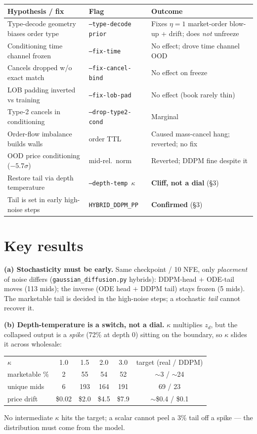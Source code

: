 \documentclass[11pt]{article}
\newcommand{\code}[1]{\texttt{\small #1}}
\begin{document}
\begin{center}
\begin{tabular}{p{6.2cm} p{2.2cm} p{6.0cm}}
\toprule
Hypothesis / fix & Flag & Outcome\\
\midrule
Type-decode geometry biases order type & \code{--type-decode prior} & Fixes $\eta{=}1$ market-order blow-up + drift; does \emph{not} unfreeze\\
Conditioning time channel frozen & \code{--fix-time} & No effect; drove time channel OOD\\
Cancels dropped w/o exact match & \code{--fix-cancel-bind} & No effect on freeze\\
LOB padding inverted vs training & \code{--fix-lob-pad} & No effect (book rarely thin)\\
Type-2 cancels in conditioning & \code{--drop-type2-cond} & Marginal\\
Order-flow imbalance builds walls & order TTL & Caused mass-cancel hang; reverted; no fix\\
OOD price conditioning ($-5.7\sigma$) & mid-rel.\ norm & Reverted; DDPM fine despite it\\
Restore tail via depth temperature & \code{--depth-temp $\kappa$} & \textbf{Cliff, not a dial} (\S3)\\
Tail is set in early high-noise steps & \code{HYBRID\_DDPM\_PP} & \textbf{Confirmed} (\S3)\\
\bottomrule
\end{tabular}
\end{center}

\section{Key results}

\textbf{(a) Stochasticity must be early.} Same checkpoint / 10 NFE, only \emph{placement} of noise
differs (\code{gaussian\_diffusion.py} hybrids): DDPM-head $+$ ODE-tail moves (113 mids); the inverse
(ODE head $+$ DDPM tail) stays frozen (5 mids). The marketable tail is decided in the high-noise
steps; a stochastic \emph{tail} cannot recover it.

\textbf{(b) Depth-temperature is a switch, not a dial.} $\kappa$ multiplies $z_d$, but the collapsed
output is a \emph{spike} (72\% at depth 0) sitting on the boundary, so $\kappa$ slides it across
wholesale:
\begin{center}
\begin{tabular}{lccccc}
\toprule
$\kappa$ & 1.0 & 1.5 & 2.0 & 3.0 & target (real / DDPM)\\
marketable \% & 2 & 55 & 54 & 52 & $\sim$3 / $\sim$24\\
unique mids & 6 & 193 & 164 & 191 & 69 / 23\\
price drift & \$0.02 & \$2.0 & \$4.5 & \$7.9 & $\sim$\$0.4 / \$0.1\\
\bottomrule
\end{tabular}
\end{center}
No intermediate $\kappa$ hits the target; a scalar cannot peel a 3\% tail off a spike --- the
distribution must come from the model.
\end{document}
